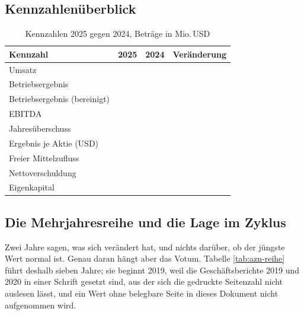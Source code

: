 \FloatBarrier

\subsection*{Kennzahlen\"uberblick}

\begin{table}[htbp]
\centering
\caption{Kennzahlen 2025 gegen 2024, Betr\"age in Mio.\,USD}
\label{tab:azn-kennzahlen}
\begin{tabular}{lrrr}
\toprule
Kennzahl & 2025 & 2024 & Ver\"anderung\\
\midrule
Umsatz                       & \Betrag{\AznUmsatzXXV} & \Betrag{\AznUmsatzXXIV} & \Pct{\AznUmsatzWachstum}\\
Betriebsergebnis             & \Betrag{\AznBetriebsergebnisXXV} & \Betrag{\AznBetriebsergebnisXXIV} & \Pct{\AznBetriebsergebnisWachstum}\\
Betriebsergebnis (bereinigt) & \Betrag{\AznCoreBetriebsergebnis} & \Betrag{\AznCoreBetriebsergebnisVJ} & \Pct{\AznCoreWachstum}\\
EBITDA                       & \Betrag{\AznEbitda} & \Betrag{\AznEbitdaVJ} & \Pct{\AznEbitdaWachstum}\\
Jahres\"uberschuss           & \Betrag{\AznJahresueberschussXXV} & \Betrag{\AznJahresueberschussXXIV} & \Pct{\AznErgebnisWachstum}\\
Ergebnis je Aktie (USD)      & \Kurswert{\AznErgebnisJeAktieXXV} & \Kurswert{\AznErgebnisJeAktieXXIV} & \Pct{\AznEpsWachstum}\\
Freier Mittelzufluss         & \Betrag{\AznFcfXXV} & \Betrag{\AznFcfXXIV} & \Pct{\AznFcfWachstum}\\
Nettoverschuldung            & \Betrag{\AznNettoverschuldung} & \Betrag{\AznNettoverschuldungVJ} & \Pct{\AznNettoverschuldungWachstum}\\
Eigenkapital                 & \Betrag{\AznEigenkapital} & \Betrag{\AznEigenkapitalVJ} & \Pct{\AznEigenkapitalWachstum}\\
\bottomrule
\end{tabular}
\end{table}

\subsection{Die Mehrjahresreihe und die Lage im Zyklus}
\label{sec:reihe-azn}

Zwei Jahre sagen, was sich ver\"andert hat, und nichts dar\"uber, ob der
j\"ungste Wert normal ist. Genau daran h\"angt aber das Votum. Tabelle
\ref{tab:azn-reihe} f\"uhrt deshalb sieben Jahre; sie beginnt 2019, weil die
Gesch\"aftsberichte 2019 und 2020 in einer Schrift gesetzt sind, aus der sich
die gedruckte Seitenzahl nicht auslesen l\"asst, und ein Wert ohne
belegbare Seite in dieses Dokument nicht aufgenommen wird.

